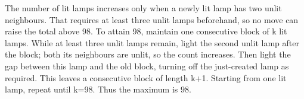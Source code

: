 The number of lit lamps increases only when a newly lit lamp has two unlit neighbours. That requires at least three unlit lamps beforehand, so no move can raise the total above 98. To attain 98, maintain one consecutive block of k lit lamps. While at least three unlit lamps remain, light the second unlit lamp after the block; both its neighbours are unlit, so the count increases. Then light the gap between this lamp and the old block, turning off the just-created lamp as required. This leaves a consecutive block of length k+1. Starting from one lit lamp, repeat until k=98. Thus the maximum is $\boxed{98}$.

